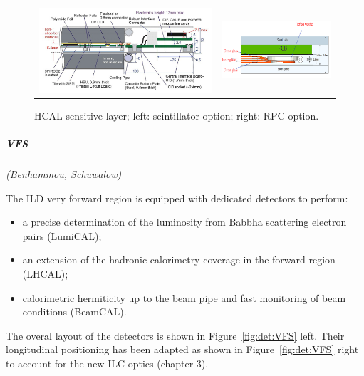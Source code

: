 \begin{figure}[t!]
\begin{tabular}{cc}
\includegraphics[width=0.5\hsize,viewport={0 -10 600 500},clip]{Detector/fig/AHCAL_layer.png} &
\includegraphics[width=0.5\hsize]{Detector/fig/SDHCAL_layer.png}
\end{tabular}
\caption{HCAL sensitive layer; left: scintillator option; right: RPC option.}
\label{fig:det:HCAL_readout}
\end{figure}


\vspace{1cm}
\subparagraph*{\bf VFS}
\textit{(Benhammou, Schuwalow)}

The ILD very forward region is equipped with dedicated detectors to perform:
\begin{itemize}
\item a precise determination of the luminosity from Babbha scattering electron pairs (LumiCAL);
\item an extension of the hadronic calorimetry coverage in the forward region (LHCAL);
\item calorimetric hermiticity up to the beam pipe and fast monitoring of beam conditions (BeamCAL).
\end{itemize}
The overal layout of the detectors is shown in Figure~\ref{fig:det:VFS} left. Their longitudinal positioning has been adapted as shown in Figure~\ref{fig:det:VFS} right to account for the new ILC optics (chapter 3).  

